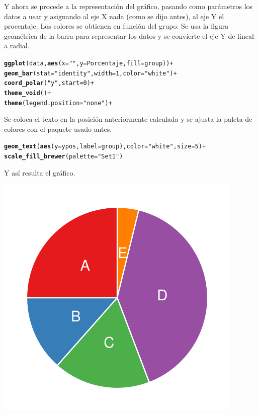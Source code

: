 \documentclass{article}\usepackage[]{graphicx}\usepackage[]{color}
\makeatletter
\def\maxwidth{ %
  \ifdim\Gin@nat@width>\linewidth
    \linewidth
  \else
    \Gin@nat@width
  \fi
}
\newcommand{\hlnum}[1]{\textcolor[rgb]{0.686,0.059,0.569}{#1}}%
\newcommand{\hlstr}[1]{\textcolor[rgb]{0.192,0.494,0.8}{#1}}%
\newcommand{\hlopt}[1]{\textcolor[rgb]{0,0,0}{#1}}%
\newcommand{\hlstd}[1]{\textcolor[rgb]{0.345,0.345,0.345}{#1}}%
\newcommand{\hlkwc}[1]{\textcolor[rgb]{0.333,0.667,0.333}{#1}}%
\newcommand{\hlkwd}[1]{\textcolor[rgb]{0.737,0.353,0.396}{\textbf{#1}}}%
\newenvironment{kframe}{%
 \def\at@end@of@kframe{}%
 \ifinner\ifhmode%
  \def\at@end@of@kframe{\end{minipage}}%
  \begin{minipage}{\columnwidth}%
 \fi\fi%
 \def\FrameCommand##1{\hskip\@totalleftmargin \hskip-\fboxsep
 \colorbox{shadecolor}{##1}\hskip-\fboxsep
     \hskip-\linewidth \hskip-\@totalleftmargin \hskip\columnwidth}%
 \MakeFramed {\advance\hsize-\width
   \@totalleftmargin\z@ \linewidth\hsize
   \@setminipage}}%
 {\par\unskip\endMakeFramed%
 \at@end@of@kframe}
\newenvironment{knitrout}{}{} %
\makeatother
\begin{document}
Y ahora se procede a la representaci\'on del gr\'afico, pasando como par\'ametros los datos a usar y asignando al eje X nada (como se dijo antes), al eje Y el procentaje. Los colores se obtienen en funci\'on del grupo. Se usa la figura geom\'etrica de la barra para representar los datos y se convierte el eje Y de lineal a radial.
\begin{knitrout}
\color{fgcolor}\begin{kframe}
\begin{alltt}
\hlkwd{ggplot}(data, \hlkwd{aes}(x=\hlstr{""}, y=Porcentaje, fill=group)) +
  \hlkwd{geom_bar}(stat=\hlstr{"identity"}, width=1, color=\hlstr{"white"}) +
  \hlkwd{coord_polar}(\hlstr{"y"}, start=0) +
  \hlkwd{theme_void}() + 
  \hlkwd{theme}(legend.position=\hlstr{"none"}) +
\end{alltt}
\end{kframe}
\end{knitrout}
Se coloca el texto en la posici\'on anteriormente calculada y se ajusta la paleta de colores con el paquete usado antes.
\begin{knitrout}
\color{fgcolor}\begin{kframe}
\begin{alltt}
  \hlkwd{geom_text}\hlstd{(}\hlkwd{aes}\hlstd{(}\hlkwc{y} \hlstd{= ypos,} \hlkwc{label} \hlstd{= group),} \hlkwc{color} \hlstd{=} \hlstr{"white"}\hlstd{,} \hlkwc{size}\hlstd{=}\hlnum{5}\hlstd{)} \hlopt{+}
  \hlkwd{scale_fill_brewer}\hlstd{(}\hlkwc{palette}\hlstd{=}\hlstr{"Set1"}\hlstd{)}
\end{alltt}
\end{kframe}
\end{knitrout}
\clearpage
Y as\'i resulta el gr\'afico.
\begin{knitrout}
\color{fgcolor}

{\centering \includegraphics[width=\maxwidth]{figure/plot_ggplot_pie-1} 

}



\end{knitrout}
\end{document}
